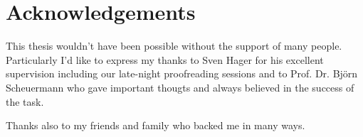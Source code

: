 \documentclass[conference]{IEEEtran}
\begin{document}
\section*{Acknowledgements}
This thesis wouldn't have been possible without the support of many people.
Particularly I'd like to express my thanks to Sven Hager for his excellent supervision including our late-night proofreading sessions and to
Prof. Dr. Bj\"orn Scheuermann who gave important thougts and always believed in the success of the task.

Thanks also to my friends and family who backed me in many ways.
\balance





%






\end{document}
